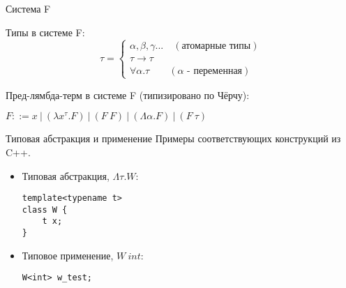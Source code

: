 \documentclass[aspectratio=169]{beamer}
\begin{document}
\begin{frame}[fragile]{Система F}
\begin{dfn}
        Типы в системе F:
 	\begin{equation*}
 	\tau =
 	\begin{cases}
 	\alpha,\beta,\gamma ...\quad(\text{атомарные типы}) \\
 	\tau\rightarrow\tau \\
 	\forall\alpha.\tau\qquad(\alpha\text{ - переменная})
 	\end{cases}
 	\end{equation*}
 \end{dfn}

 \begin{dfn}
        Пред-лямбда-терм в системе F (типизировано по Чёрчу):
 	\begin{center}
 		$F ::= x\ |\ (\lambda x^{\tau}.F)\ |\ (F\ F)\ |\ (\Lambda\alpha.F)\ |\ (F\ \tau)$ 
 	\end{center}
 \end{dfn}
\end{frame}

\begin{frame}[fragile]{Типовая абстракция и применение}
   Примеры соответствующих конструкций из C++.
   \begin{itemize}
    \item Типовая абстракция, $\Lambda \tau.W$:
    \begin{verbatim}
template<typename t>
class W {
    t x;
}
    \end{verbatim}
 	
    \item Типовое применение, $W\ int$:
    \begin{verbatim}
W<int> w_test;
    \end{verbatim}
  \end{itemize}
\end{frame}
 	
\end{document}
